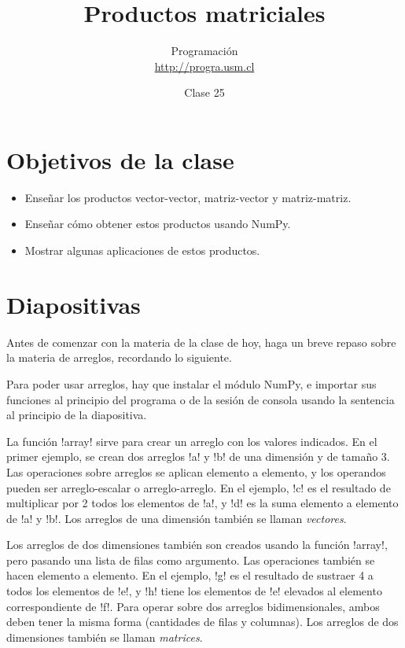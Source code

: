 \documentclass[10pt]{article}
\title{Productos matriciales}
\author{Programación \\ \url{http://progra.usm.cl}}
\date{Clase 25}
\begin{document}
  \maketitle

  \section*{Objetivos de la clase}
  \begin{itemize}
    \item Enseñar los productos
      vector-vector, matriz-vector y matriz-matriz.
    \item Enseñar cómo obtener estos productos usando NumPy.
    \item Mostrar algunas aplicaciones de estos productos.
  \end{itemize}

  \section*{Diapositivas}


  Antes de comenzar con la materia de la clase de hoy,
  haga un breve repaso sobre la materia de arreglos,
  recordando lo siguiente.

  Para poder usar arreglos,
  hay que instalar el módulo NumPy,
  e importar sus funciones al principio del programa
  o de la sesión de consola
  usando la sentencia al principio de la diapositiva.

  La función \li!array! sirve para crear un arreglo
  con los valores indicados.
  En el primer ejemplo,
  se crean dos arreglos \li!a! y \li!b! de una dimensión y de tamaño 3.
  Las operaciones sobre arreglos se aplican elemento a elemento,
  y los operandos pueden ser arreglo-escalar o arreglo-arreglo.
  En el ejemplo,
  \li!c! es el resultado de multiplicar por 2 todos los elementos de \li!a!,
  y \li!d! es la suma elemento a elemento de \li!a! y \li!b!.
  Los arreglos de una dimensión también se llaman \emph{vectores}.

  Los arreglos de dos dimensiones
  también son creados usando la función \li!array!,
  pero pasando una lista de filas como argumento.
  Las operaciones también se hacen elemento a elemento.
  En el ejemplo,
  \li!g! es el resultado de sustraer 4 a todos los elementos de \li!e!,
  y  \li!h! tiene los elementos de \li!e!
  elevados al elemento correspondiente de \li!f!.
  Para operar sobre dos arreglos bidimensionales,
  ambos deben tener la misma forma (cantidades de filas y columnas).
  Los arreglos de dos dimensiones también se llaman \emph{matrices}.
\end{document}
